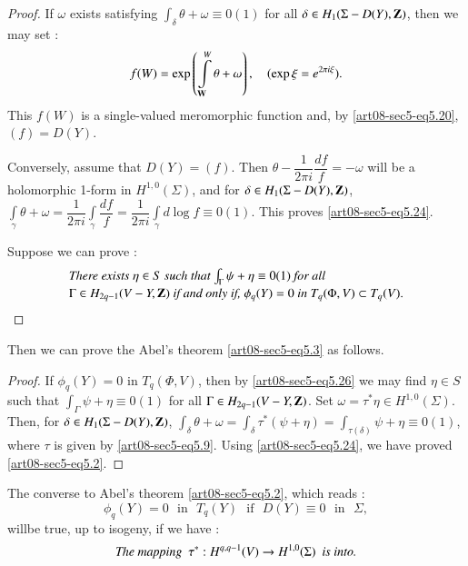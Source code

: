 \begin{proof}
If $\omega$ exists satisfying $\int_{\delta}\theta+\omega\equiv 0(1)$ for all $\delta\in H_{1}(\Sigma-D(Y),\mathbf{Z})$, then we may set :
\begin{equation}
f(W)=\exp \left(\int\limits^{W}_{\mathbf{W}}\theta+\omega\right),\quad (\exp \xi=e^{2\pi i\xi}).\label{art08-sec5-eq5.25}
\end{equation}
This $f(W)$ is a single-valued meromorphic function and, by \eqref{art08-sec5-eq5.20}, $(f)=D(Y)$.

Conversely, assume that $D(Y)=(f)$. Then $\theta-\dfrac{1}{2\pi i}\dfrac{df}{f}=-\omega$ will be a holomorphic 1-form in $H^{1,0}(\Sigma)$, and for $\delta\in H_{1}(\Sigma-D(Y),\mathbf{Z})$, $\int\limits_{\gamma}\theta+\omega=\dfrac{1}{2\pi i}\int\limits_{\gamma}\dfrac{df}{f}=\dfrac{1}{2\pi i}\int\limits_{\gamma}d\log f\equiv 0(1)$. This proves \eqref{art08-sec5-eq5.24}.

Suppose we can prove :
\begin{equation}
\begin{array}{l}
\text{\em There exists $\eta\in S$ such that $\int_{\Gamma}\psi+\eta\equiv 0(1)$ for all}\\[2pt]
\Gamma\in H_{2q-1}(V-Y,\mathbf{Z})\text{~\em if and only if,~}\phi_{q}(Y)=0\text{~\em in~} T_{q}(\Phi,V)\subset T_{q}(V).
\end{array}\label{art08-sec5-eq5.26}
\end{equation}
\end{proof}

Then we can prove the Abel's theorem \eqref{art08-sec5-eq5.3} as follows.

\begin{proof}
If $\phi_{q}(Y)=0$ in $T_{q}(\Phi,V)$, then by \eqref{art08-sec5-eq5.26} we may find $\eta\in S$ such that $\int_{\Gamma}\psi+\eta\equiv 0(1)$ for all $\Gamma\in H_{2q-1}(V-Y,\mathbf{Z})$. Set $\omega=\tau^{*}\eta\in H^{1,0}(\Sigma)$. Then, for $\delta\in H_{1}(\Sigma-D(Y),\mathbf{Z})$, $\int_{\delta}\theta+\omega=\int_{\delta}\tau^{*}(\psi+\eta)=\int_{\tau(\delta)}\psi+\eta\equiv 0(1)$, where $\tau$ is given by \eqref{art08-sec5-eq5.9}. Using \eqref{art08-sec5-eq5.24}, we have proved \eqref{art08-sec5-eq5.2}.
\end{proof}

\setcounter{theorem}{26}
\begin{remark}\label{art08-sec5-rem5.27}
The converse to Abel's theorem \eqref{art08-sec5-eq5.2}, which reads :
\setcounter{equation}{27}
\begin{equation}
\phi_{q}(Y)=0\text{~ in~ } T_{q}(Y)\text{~ if~ } D(Y)\equiv 0\text{~ in~ }\Sigma,\label{art08-sec5-eq5.28}
\end{equation}
will\pageoriginale be true, up to isogeny, if we have :
\begin{equation}
\text{\em The mapping~ } \tau^{*}:H^{q,q-1}(V)\to H^{1,0}(\Sigma)\text{~ \em is into.}\label{art08-sec5-eq5.29}
\end{equation}
\end{remark}

